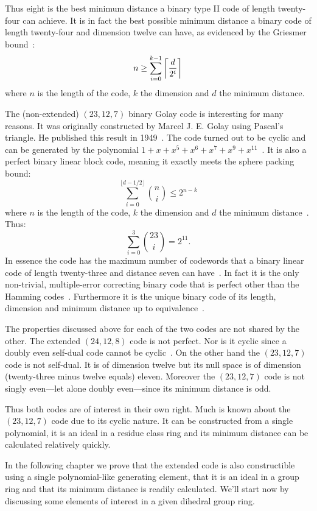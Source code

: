 Thus eight is the best minimum distance a binary type II code of length twenty-four can achieve.
It is in fact the best possible minimum distance a binary code of length twenty-four and dimension twelve can have, as evidenced by the Griesmer bound~\cite[p.~81]{huf03}:
\[ n \ge \sum_{i=0}^{k-1} \bigg{\lceil} \frac{d}{2^i} \bigg{\rceil} \]
where $n$ is the length of the code, $k$ the dimension and $d$ the minimum distance.

The (non-extended) $(23,12,7)$ binary Golay code is interesting for many reasons.
It was originally constructed by Marcel J. E. Golay using Pascal's triangle.
He published this result in 1949~\cite{gol49}.
The code turned out to be cyclic and can be generated by the polynomial $1+x+x^5+x^6+x^7+x^9+x^{11}$~\cite[p.~401]{huf03}.
It is also a perfect binary linear block code, meaning it exactly meets the sphere packing bound:
\[\sum_{i=0}^{ \lfloor d-1/2 \rfloor } {n \choose i} \leq 2^{n-k}\]
where $n$ is the length of the code, $k$ the dimension and $d$ the minimum distance~\cite[p.~48]{huf03}.
Thus:
\[\sum_{i=0}^{3} {23 \choose i} = 2^{11}.\]
In essence the code has the maximum number of codewords that a binary linear code of length twenty-three and distance seven can have~\cite[p.~49]{huf03}.
In fact it is the only non-trivial, multiple-error correcting binary code that is perfect other than the Hamming codes~\cite[p.~49]{huf03}.
Furthermore it is the unique binary code of its length, dimension and minimum distance up to equivalence~\cite[p.~49]{huf03}.

The properties discussed above for each of the two codes are not shared by the other.
The extended $(24,12,8)$ code is not perfect.
Nor is it cyclic since a doubly even self-dual code cannot be cyclic~\cite{slo83}.
On the other hand the $(23,12,7)$ code is not self-dual.
It is of dimension twelve but its null space is of dimension (twenty-three minus twelve equals) eleven.
Moreover the $(23,12,7)$ code is not singly even---let alone doubly even---since its minimum distance is odd.

Thus both codes are of interest in their own right.
Much is known about the $(23,12,7)$ code due to its cyclic nature.
It can be constructed from a single polynomial, it is an ideal in a residue class ring and its minimum distance can be calculated relatively quickly.

In the following chapter we prove that the extended code is also constructible using a single polynomial-like generating element, that it is an ideal in a group ring and that its minimum distance is readily calculated.
We'll start now by discussing some elements of interest in a given dihedral group ring.


